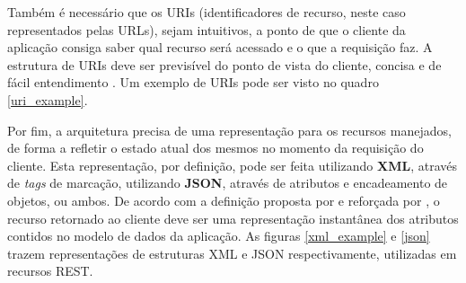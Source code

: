 \documentclass[12pt, openright, oneside, a4paper, brazil]{abntex2}
\begin{document}
Também é necessário que os URIs (identificadores de recurso, neste caso representados pelas URLs), sejam intuitivos, a ponto de que o cliente da aplicação consiga saber qual recurso será acessado e o que a requisição faz. A estrutura de URIs deve ser previsível do ponto de vista do cliente, concisa e de fácil entendimento \cite{rodriguez2008restful}. Um exemplo de URIs pode ser visto no quadro \ref{uri_example}.


Por fim, a arquitetura precisa de uma representação para os recursos manejados, de forma a refletir o estado atual dos mesmos no momento da requisição do cliente. Esta representação, por definição, pode ser feita utilizando \textbf{XML}, através de \textit{tags} de marcação, utilizando \textbf{JSON}, através de atributos e encadeamento de objetos, ou ambos. De acordo com a definição proposta por  e reforçada por , o recurso retornado ao cliente deve ser uma representação instantânea dos atributos contidos no modelo de dados da aplicação. As figuras \ref{xml_example} e \ref{json} trazem representações de estruturas XML e JSON respectivamente, utilizadas em recursos REST.
\end{document}

